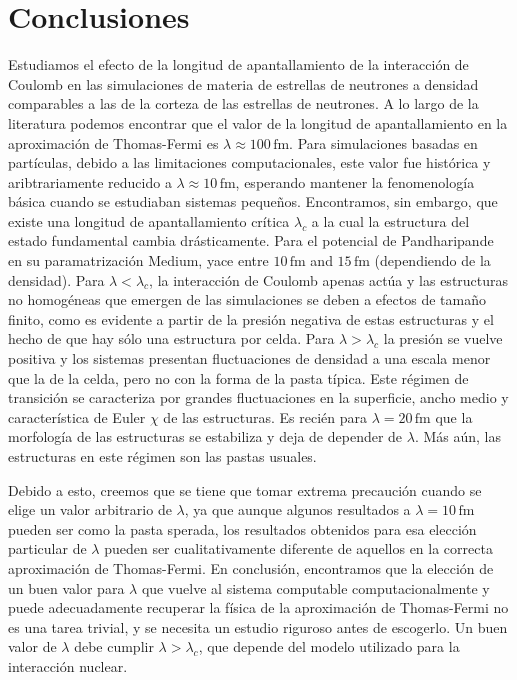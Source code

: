 \section{Conclusiones}\label{concluding}

Estudiamos el efecto de la longitud de apantallamiento de la interacción de Coulomb en las simulaciones de materia de estrellas de neutrones a densidad comparables a las de la corteza de las estrellas de neutrones.
A lo largo de la literatura podemos encontrar que el valor de la longitud de apantallamiento en la aproximación de Thomas-Fermi es $\lambda\approx100\,\text{fm}$.
Para simulaciones basadas en partículas, debido a las limitaciones computacionales, este valor fue histórica y aribtrariamente reducido a $\lambda\approx10\,\text{fm}$, esperando mantener la fenomenología básica cuando se estudiaban sistemas pequeños.
Encontramos, sin embargo, que existe una longitud de apantallamiento crítica $\lambda_c$ a la cual la estructura del estado fundamental cambia drásticamente.
Para el potencial de Pandharipande en su paramatrización Medium, yace entre $10\,\text{fm}$ and $15\,\text{fm}$ (dependiendo de la densidad).
Para $\lambda<\lambda_c$, la interacción de Coulomb apenas actúa y las estructuras no homogéneas que emergen de las simulaciones se deben a efectos de tamaño finito, como es evidente a partir de la presión negativa de estas estructuras y el hecho de que hay sólo una estructura por celda.
Para $\lambda>\lambda_c$ la presión se vuelve positiva y los sistemas presentan fluctuaciones de densidad a una escala menor que la de la celda, pero no con la forma de la pasta típica.
Este régimen de transición se caracteriza por grandes fluctuaciones en la superficie, ancho medio y característica de Euler $\chi$ de las estructuras.
Es recién para $\lambda=20\,\text{fm}$ que la morfología de las estructuras se estabiliza y deja de depender de $\lambda$.
Más aún, las estructuras en este régimen son las pastas usuales.

Debido a esto, creemos que se tiene que tomar extrema precaución cuando se elige un valor arbitrario de $\lambda$, ya que aunque algunos resultados a $\lambda=10\,\text{fm}$ pueden ser como la pasta sperada, los resultados obtenidos para esa elección particular de $\lambda$ pueden ser cualitativamente diferente de aquellos en la correcta aproximación de Thomas-Fermi.
En conclusión, encontramos que la elección de un buen valor para $\lambda$ que vuelve al sistema computable computacionalmente y puede adecuadamente recuperar la física de la aproximación de Thomas-Fermi no es una tarea trivial, y se necesita un estudio riguroso antes de escogerlo.
Un buen valor de $\lambda$ debe cumplir $\lambda>\lambda_c$, que depende del modelo utilizado para la interacción nuclear.

